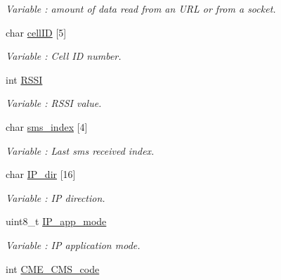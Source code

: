 \begin{DoxyCompactItemize}
\begin{DoxyCompactList}\small\item\em Variable \+: amount of data read from an U\+RL or from a socket. \end{DoxyCompactList}\item 
char \hyperlink{class_wasp_g_p_r_s___pro__core_a7a861cc2ee2bc5d9dd6fa43665a29135}{cell\+ID} \mbox{[}5\mbox{]}\hypertarget{class_wasp_g_p_r_s___pro__core_a7a861cc2ee2bc5d9dd6fa43665a29135}{}\label{class_wasp_g_p_r_s___pro__core_a7a861cc2ee2bc5d9dd6fa43665a29135}

\begin{DoxyCompactList}\small\item\em Variable \+: Cell ID number. \end{DoxyCompactList}\item 
int \hyperlink{class_wasp_g_p_r_s___pro__core_a67c5f199ea78f480b4ad23e20b4d1b33}{R\+S\+SI}\hypertarget{class_wasp_g_p_r_s___pro__core_a67c5f199ea78f480b4ad23e20b4d1b33}{}\label{class_wasp_g_p_r_s___pro__core_a67c5f199ea78f480b4ad23e20b4d1b33}

\begin{DoxyCompactList}\small\item\em Variable \+: R\+S\+SI value. \end{DoxyCompactList}\item 
char \hyperlink{class_wasp_g_p_r_s___pro__core_aa3c60bd3ba8a89f7bf3ff764df8776c6}{sms\+\_\+index} \mbox{[}4\mbox{]}\hypertarget{class_wasp_g_p_r_s___pro__core_aa3c60bd3ba8a89f7bf3ff764df8776c6}{}\label{class_wasp_g_p_r_s___pro__core_aa3c60bd3ba8a89f7bf3ff764df8776c6}

\begin{DoxyCompactList}\small\item\em Variable \+: Last sms received index. \end{DoxyCompactList}\item 
char \hyperlink{class_wasp_g_p_r_s___pro__core_ad9eec39f8bb3fcb0776954d4e5aa8610}{I\+P\+\_\+dir} \mbox{[}16\mbox{]}\hypertarget{class_wasp_g_p_r_s___pro__core_ad9eec39f8bb3fcb0776954d4e5aa8610}{}\label{class_wasp_g_p_r_s___pro__core_ad9eec39f8bb3fcb0776954d4e5aa8610}

\begin{DoxyCompactList}\small\item\em Variable \+: IP direction. \end{DoxyCompactList}\item 
uint8\+\_\+t \hyperlink{class_wasp_g_p_r_s___pro__core_a0e35adb0246e794e218f05af6dcca9b8}{I\+P\+\_\+app\+\_\+mode}
\begin{DoxyCompactList}\small\item\em Variable \+: IP application mode. \end{DoxyCompactList}\item 
int \hyperlink{class_wasp_g_p_r_s___pro__core_ac9287498856001449a83b8892797408b}{C\+M\+E\+\_\+\+C\+M\+S\+\_\+code}\hypertarget{class_wasp_g_p_r_s___pro__core_ac9287498856001449a83b8892797408b}{}\label{class_wasp_g_p_r_s___pro__core_ac9287498856001449a83b8892797408b}


\end{DoxyCompactItemize}
